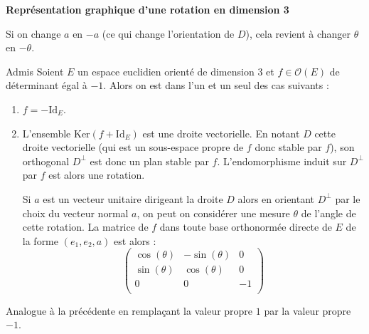 \documentclass[french,11pt,twoside]{VcCours}
\begin{document}
\medskip

\begin{center}
\textbf{Représentation graphique d'une rotation en dimension 3}
\end{center}

\newpage

%
%
%

\begin{Remarque}{} Si on change $a$ en $-a$ (ce qui change l'orientation de $D$), cela revient à changer $\theta$ en $- \theta$.
\end{Remarque}

\begin{Theoreme}{Admis} Soient $E$ un espace euclidien orienté de dimension $3$ et $f \in \mathcal{O}(E)$ de déterminant égal à $-1$. Alors on est dans l'un et un seul des cas suivants :
\begin{enumerate}
\item $f= -\textrm{Id}_E$.
\item L'ensemble $\textrm{Ker}(f +\textrm{Id}_E)$ est une droite vectorielle. En notant $D$ cette droite vectorielle (qui est un sous-espace propre de $f$ donc stable par $f$), son orthogonal $D^{\perp}$ est donc un plan stable par $f$. L'endomorphisme induit sur $D^{\perp}$ par $f$ est alors une rotation.

\medskip

Si $a$ est un vecteur unitaire dirigeant la droite $D$ alors en orientant $D^{\perp}$ par le choix du vecteur normal $a$, on peut on considérer une mesure $\theta$ de l'angle de cette rotation. La matrice de $f$ dans toute base orthonormée directe de $E$ de la forme $(e_1,e_2,a)$ est alors :
$$ \begin{pmatrix}
\cos(\theta) & -\sin(\theta) & 0 \\
\sin(\theta) & \cos(\theta) & 0 \\
0 & 0 &- 1 \\
\end{pmatrix}$$
\end{enumerate}
\end{Theoreme}

\begin{Demonstration}{} Analogue à la précédente en remplaçant la valeur propre $1$ par la valeur propre $-1$.
\end{Demonstration}
\end{document}
